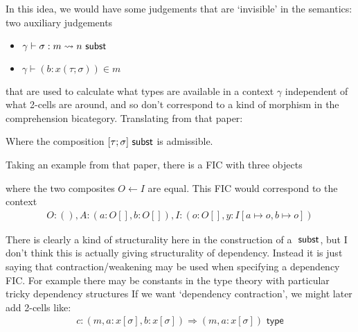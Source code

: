 \documentclass[10pt]{article}
\newcommand{\yields}{\vdash}
\newcommand{\type}{\,\,\mathsf{type}}
\begin{document}
In this idea, we would have some judgements that are `invisible' in the semantics: two auxiliary judgements
\begin{itemize}
\item $\gamma \yields \sigma : m \leadsto n \subst$
\item $\gamma \yields (b : x(\tau ; \sigma)) \in m$
\end{itemize}
that are used to calculate what types are available in a context $\gamma$ independent of what 2-cells are around, and so don't correspond to a kind of morphism in the comprehension bicategory. Translating from that paper:
Where the composition $[\tau ; \sigma] \,\,\mathsf{subst}$ is admissible. 

Taking an example from that paper, there is a FIC with three objects
where the two composites $O \leftarrow I$ are equal. This FIC would correspond to the context
\begin{align*}
O : (), A : (a : O[], b : O[]), I : (o : O[], y : I[a \mapsto o, b \mapsto o])
\end{align*}

There is clearly a kind of structurality here in the construction of a $\,\,\mathsf{subst}$, but I don't think this is actually giving structurality of dependency. Instead it is just saying that contraction/weakening may be used when specifying a dependency FIC. For example there may be constants in the type theory with particular tricky dependency structures If we want `dependency contraction', we might later add 2-cells like:
\begin{align*}
c : (m, a : x[\sigma], b : x[\sigma]) \Rightarrow (m, a : x[\sigma]) \type
\end{align*}
\end{document}
